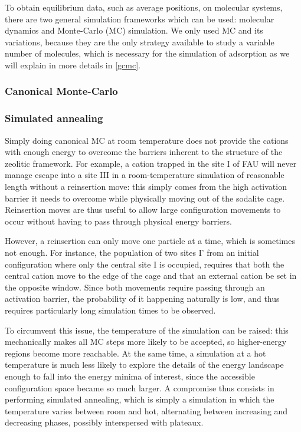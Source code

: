 \documentclass[main.tex]{subfiles}
\begin{document}
To obtain equilibrium data, such as average positions, on molecular systems, there are two general simulation frameworks which can be used: molecular dynamics and Monte-Carlo (MC) simulation. We only used MC and its variations, because they are the only strategy available to study a variable number of molecules, which is necessary for the simulation of adsorption as we will explain in more details in \autoref{gcmc}.

\subsubsection{Canonical Monte-Carlo}
\subsubsection{Simulated annealing}

Simply doing canonical MC at room temperature does not provide the cations with enough energy to overcome the barriers inherent to the structure of the zeolitic framework. For example, a cation trapped in the site I of FAU will never manage escape into a site III in a room-temperature simulation of reasonable length without a reinsertion move: this simply comes from the high activation barrier it needs to overcome while physically moving out of the sodalite cage. Reinsertion moves are thus useful to allow large configuration movements to occur without having to pass through physical energy barriers.

However, a reinsertion can only move one particle at a time, which is sometimes not enough. For instance, the population of two sites I' from an initial configuration where only the central site I is occupied, requires that both the central cation move to the edge of the cage and that an external cation be set in the opposite window. Since both movements require passing through an activation barrier, the probability of it happening naturally is low, and thus requires particularly long simulation times to be observed.

To circumvent this issue, the temperature of the simulation can be raised: this mechanically makes all MC steps more likely to be accepted, so higher-energy regions become more reachable. At the same time, a simulation at a hot temperature is much less likely to explore the details of the energy landscape enough to fall into the energy minima of interest, since the accessible configuration space became so much larger. A compromise thus consists in performing simulated annealing, which is simply a simulation in which the temperature varies between room and hot, alternating between increasing and decreasing phases, possibly interspersed with plateaux.
\end{document}

